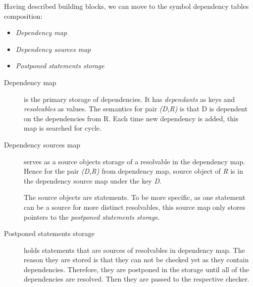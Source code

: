 \vspace{0.5cm}

Having described building blocks, we can move to the symbol dependency tables composition:
\begin{itemize}
	\item \emph{Dependency map}
	\item \emph{Dependency sources map}
	\item \emph{Postponed statements storage}
\end{itemize}

\begin{description}
	\item[Dependency map] is the primary storage of dependencies. It has \emph{dependants} as keys and \emph{resolvables} as values. The semantics for pair \emph{(D,R)} is that D is dependent on the dependencies from R. Each time new dependency is added, this map is searched for cycle.
	
	\item[Dependency sources map] serves as a source objects storage of a resolvable in the dependency map. Hence for the pair \emph{(D,R)} from dependency map, source object of \emph{R} is in the dependency source map under the key \emph{D}. 
	
	The source objects are statements. To be more specific, as one statement can be a source for more distinct resolvables, this source map only stores pointers to the \emph{postponed statements storage}.
	
	\item[Postponed statements storage] holds statements that are sources of resolvables in dependency map. The reason they are stored is that they can not be checked yet as they contain dependencies. Therefore, they are postponed in the storage until all of the dependencies are resolved. Then they are passed to the respective checker.
\end{description}


